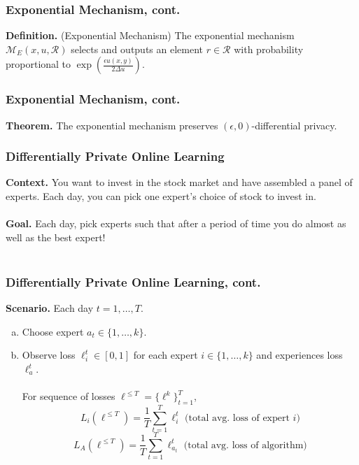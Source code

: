 \documentclass[aspectratio=169]{beamer}
\newcommand{\emm}{\mathcal{M}}
\begin{document}
\begin{frame}
\frametitle{Exponential Mechanism, cont.}

\textbf{Definition.} (Exponential Mechanism) The exponential mechanism $\emm_E(x, u, \mathcal{R})$ selects and outputs an element $r \in \mathcal{R}$ with probability proportional to $\exp(\frac{\epsilon u(x,y)}{2\Delta u})$.
\end{frame}

\begin{frame}
\frametitle{Exponential Mechanism, cont.}

\textbf{Theorem.} The exponential mechanism preserves $(\epsilon, 0)$-differential privacy.
\end{frame}

\begin{frame}
\frametitle{Differentially Private Online Learning}

\textbf{Context.} You want to invest in the stock market and have assembled a panel of experts. Each day, you can pick one expert's choice of stock to invest in.\\~\\

\textbf{Goal.} Each day, pick experts such that after a period of time you do almost as well as the best expert!\\~\\
\end{frame}

\begin{frame}
\frametitle{Differentially Private Online Learning, cont.}

\textbf{Scenario.} Each day $t = 1, \dots, T$.
\begin{enumerate}[(a)]
  \item Choose expert $a_t \in \{1, \dots, k\}$.
  \item Observe loss $\ell_i^t \in [0,1]$ for each expert $i \in \{1, \dots, k\}$ and experiences loss $\ell_a^t$.\\~\\

  For sequence of losses $\ell^{\leq T} = \{\ell^k\}_{t=1}^T$,
  $$L_i(\ell^{\leq T}) = \frac{1}{T} \sum_{t=1}^T \ell_i^t \text{    (total avg. loss of expert $i$)}$$
  $$L_A(\ell^{\leq T}) = \frac{1}{T} \sum_{t=1}^T \ell_{a_t}^t \text{    (total avg. loss of algorithm)}$$
\end{enumerate}
\end{frame}
\end{document}
